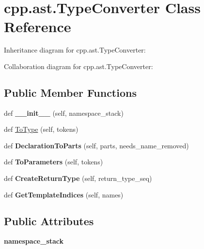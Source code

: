 \hypertarget{classcpp_1_1ast_1_1TypeConverter}{}\section{cpp.\+ast.\+Type\+Converter Class Reference}
\label{classcpp_1_1ast_1_1TypeConverter}


Inheritance diagram for cpp.\+ast.\+Type\+Converter\+:


Collaboration diagram for cpp.\+ast.\+Type\+Converter\+:
\subsection*{Public Member Functions}
\begin{DoxyCompactItemize}
\item 
\mbox{\label{classcpp_1_1ast_1_1TypeConverter_ae6e75773d6722cdbb96d510a49cb633a}} 
def {\bfseries \+\_\+\+\_\+init\+\_\+\+\_\+} (self, namespace\+\_\+stack)
\item 
def \hyperlink{classcpp_1_1ast_1_1TypeConverter_aa6ea82e40cd30e5dfcd471ff144a19cf}{To\+Type} (self, tokens)
\item 
\mbox{\label{classcpp_1_1ast_1_1TypeConverter_a7c9d20d107c2bc0eb80afdf04957825f}} 
def {\bfseries Declaration\+To\+Parts} (self, parts, needs\+\_\+name\+\_\+removed)
\item 
\mbox{\label{classcpp_1_1ast_1_1TypeConverter_aeaf27fb1890f65d7216703df610b46d5}} 
def {\bfseries To\+Parameters} (self, tokens)
\item 
\mbox{\label{classcpp_1_1ast_1_1TypeConverter_a7e4d429131d9d5742ec44c78b61beb87}} 
def {\bfseries Create\+Return\+Type} (self, return\+\_\+type\+\_\+seq)
\item 
\mbox{\label{classcpp_1_1ast_1_1TypeConverter_a7b5244be5a0caedd769ae866f8a182aa}} 
def {\bfseries Get\+Template\+Indices} (self, names)
\end{DoxyCompactItemize}
\subsection*{Public Attributes}
\begin{DoxyCompactItemize}
\item 
\mbox{\label{classcpp_1_1ast_1_1TypeConverter_abb739f15c6cd0800e07c086c2b30833e}} 
{\bfseries namespace\+\_\+stack}
\end{DoxyCompactItemize}



